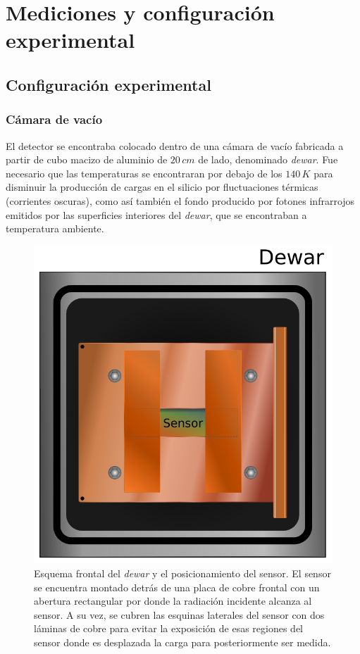 \chapter{Mediciones y configuración experimental \label{chap:ConfiguracionExperimental}}
\section{Configuración experimental}
\subsection{Cámara de vacío}
\noindent El detector se encontraba colocado dentro de una cámara de vacío fabricada a partir de cubo macizo de aluminio de $20\,\si{cm}$ de lado, denominado \textit{dewar}. Fue necesario que las temperaturas se encontraran por debajo de los $140\,\si{K}$ para disminuir la producción de cargas en el silicio por fluctuaciones térmicas (corrientes oscuras), como así también el fondo producido por fotones infrarrojos emitidos por las superficies interiores del \textit{dewar}, que se encontraban a temperatura ambiente.
\begin{figure}%
    \centering
    \includegraphics[scale=0.5]{Figs/Frontal_Dewar_Sensor.pdf}
    \caption{\footnotesize{Esquema frontal del \textit{dewar} y el posicionamiento del sensor. El sensor se encuentra montado detrás de una placa de cobre frontal con un abertura rectangular por donde la radiación incidente alcanza al sensor. A su vez, se cubren las esquinas laterales del sensor con dos láminas de cobre para evitar la exposición de esas regiones del sensor donde es desplazada la carga para posteriormente ser medida.}}
    \label{fig:FrontalDewarYSensor}
\end{figure}

